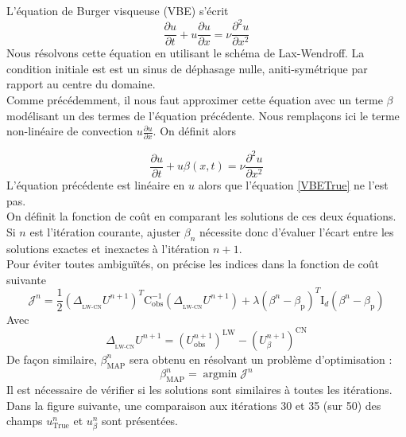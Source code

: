 \documentclass[a4paper,12pt]{article}
\newcommand{\argmin}{\mathop{\mathrm{argmin}}}
\newcommand{\bepar}[1]{
	\left( #1 \right)  
}
\newcommand{\bmap}{\beta_{\text{MAP}}}
\numberwithin{equation}{section} %
\begin{document}
\noindent L'équation de Burger visqueuse (VBE) s'écrit 
\begin{equation}
\frac{\partial u}{\partial t} + u \frac{\partial u}{\partial x} = \nu\frac{\partial^2 u}{\partial x^2}  \label{VBETrue} \tag{VBE}
\end{equation}
Nous résolvons cette équation en utilisant le schéma de Lax-Wendroff. La condition initiale est est un sinus de déphasage nulle, aniti-symétrique par rapport au centre du domaine.\\
Comme précédemment, il nous faut approximer cette équation avec un terme $\beta$ modélisant un des termes de l'équation précédente. Nous remplaçons ici le terme non-linéaire de convection $\displaystyle u \frac{\partial u}{\partial x}$. On définit alors

\begin{equation}
\frac{\partial u}{\partial t} + u \beta(x,t) = \nu \frac{\partial^2 u}{\partial x^2} \label{VBEbeta} \tag{VBE$\beta$}
\end{equation}
L'équation précédente est linéaire en $u$ alors que l'équation \eqref{VBETrue} ne l'est pas.\\
On définit la fonction de coût en comparant les solutions de ces deux équations. Si $n$ est l'itération courante, ajuster $\beta_n$ nécessite donc d'évaluer l'écart entre les solutions exactes et inexactes à l'itération $n+1$.\\
Pour éviter toutes ambiguïtés, on précise les indices dans la fonction de coût suivante 
\begin{equation}
\mathcal{J}^n = \frac{1}{2} \bepar{\Delta_{_{\text{LW-CN}}}U^{n+1}}^T \text{C}_\text{obs}^{-1} \bepar{\Delta_{_{\text{LW-CN}}}U^{n+1}} + \lambda \bepar{\beta^n -
			\beta_{\text{p}}}^T \text{I}_d \bepar{\beta^n - \beta_\text{p}}
\end{equation}
Avec 
\begin{equation}
\Delta_{_{\text{LW-CN}}}U^{n+1} = \bepar{U^{n+1}_{\text{obs}}}^\text{LW} - \bepar{U^{n+1}_\beta}^\text{CN}
\end{equation}
De façon similaire, $\bmap^{n}$ sera obtenu en résolvant un problème d'optimisation :
\begin{equation}
\beta_{\text{MAP}}^n = \argmin \mathcal{J}^n
\end{equation}
Il est nécessaire de vérifier si les solutions sont similaires à toutes les itérations. Dans la figure suivante, une comparaison aux itérations 30 et 35 (sur 50) des champs $u^n_{\text{True}}$ et $u^n_{\beta}$ sont présentées. 
\end{document}
